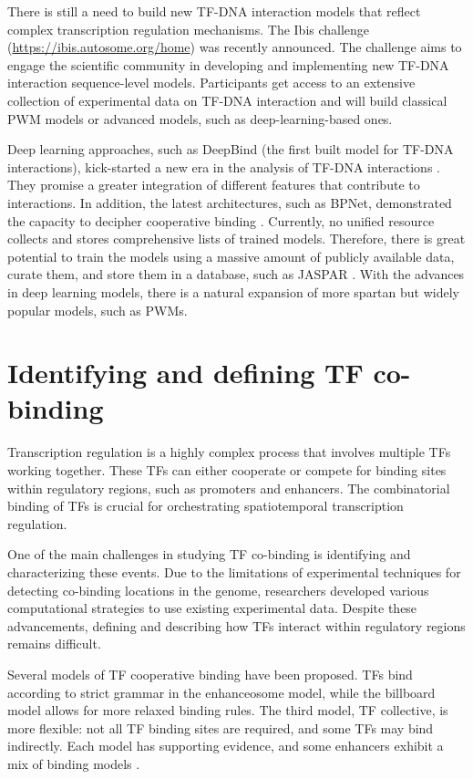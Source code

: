     There is still a need to build new TF-DNA interaction models that reflect complex transcription regulation mechanisms. The Ibis challenge (\url{https://ibis.autosome.org/home}) was recently announced. The challenge aims to engage the scientific community in developing and implementing new TF-DNA interaction sequence-level models. Participants get access to an extensive collection of experimental data on TF-DNA interaction and will build classical PWM models or advanced models, such as deep-learning-based ones.

    Deep learning approaches, such as DeepBind (the first built model for TF-DNA interactions), kick-started a new era in the analysis of TF-DNA interactions \cite{alipanahi2015predicting}. They promise a greater integration of different features that contribute to interactions. In addition, the latest architectures, such as BPNet, demonstrated the capacity to decipher cooperative binding \cite{avsec2021base}. Currently, no unified resource collects and stores comprehensive lists of trained models. Therefore, there is great potential to train the models using a massive amount of publicly available data, curate them, and store them in a database, such as JASPAR \cite{rauluseviciute2024jaspar}. With the advances in deep learning models, there is a natural expansion of more spartan but widely popular models, such as PWMs.

    \section{Identifying and defining TF co-binding}

    Transcription regulation is a highly complex process that involves multiple TFs working together. These TFs can either cooperate or compete for binding sites within regulatory regions, such as promoters and enhancers. The combinatorial binding of TFs is crucial for orchestrating spatiotemporal transcription regulation.

    One of the main challenges in studying TF co-binding is identifying and characterizing these events. Due to the limitations of experimental techniques for detecting co-binding locations in the genome, researchers developed various computational strategies to use existing experimental data. Despite these advancements, defining and describing how TFs interact within regulatory regions remains difficult.

    Several models of TF cooperative binding have been proposed. TFs bind according to strict grammar in the enhanceosome model, while the billboard model allows for more relaxed binding rules. The third model, TF collective, is more flexible: not all TF binding sites are required, and some TFs may bind indirectly. Each model has supporting evidence, and some enhancers exhibit a mix of binding models \cite{georgakopoulos2023transcription,wang2022towards}. 

